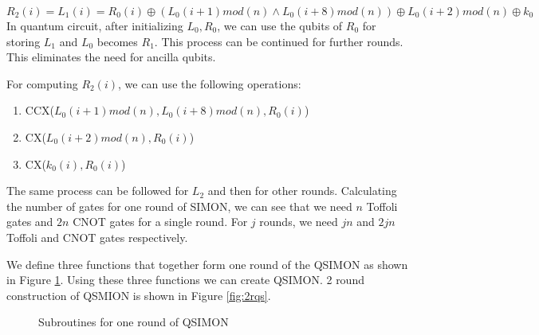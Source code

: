 \documentclass[preprint]{transcrypto}
\begin{document}
\begin{equation*}
    R_2(i) = L_1(i) = R_0(i) \oplus (L_0(i+1)mod(n) \wedge L_0(i+8)mod(n)) \oplus L_0(i+2)mod(n) \oplus k_0
\end{equation*}
In quantum circuit, after initializing $L_0, R_0$, we can use the qubits of $R_0$ for storing $L_1$ and $L_0$ becomes $R_1$. This process can be continued for further rounds. This eliminates the need for ancilla qubits. 

For computing $R_2(i)$, we can use the following operations:
\begin{enumerate}
    \item CCX($L_0(i+1)mod(n), L_0(i+8)mod(n), R_0(i)$)
    \item CX($L_0(i+2)mod(n), R_0(i)$)
    \item CX($k_0(i), R_0(i)$)
\end{enumerate}

The same process can be followed for $L_2$ and then for other rounds. Calculating the number of gates for one round of SIMON, we can see that we need $n$ Toffoli gates and $2n$ CNOT gates for a single round. For $j$ rounds, we need $jn$ and $2jn$ Toffoli and CNOT gates respectively.

We define three functions that together form one round of the QSIMON as shown in Figure \ref{fig:sqs}. Using these three functions we can create QSIMON. 2 round construction of QSMION is shown in Figure \ref{fig:2rqs}.

\begin{figure}[h!]
   
\endminipage\hfill
{}
\endminipage\hfill
{}%
\endminipage
\caption{Subroutines for one round of QSIMON}
\label{fig:sqs}
\end{figure}
\end{document}
